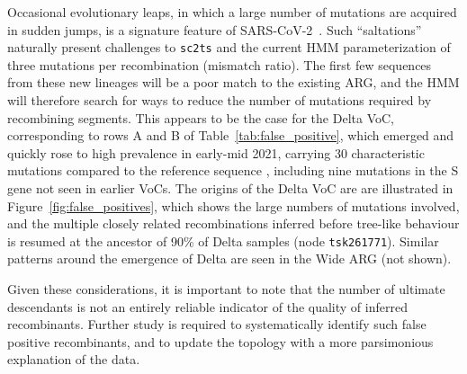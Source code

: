 \documentclass{article}
\begin{document}
Occasional evolutionary leaps, in which a large number of mutations
are acquired in sudden jumps,
is a signature feature of
SARS-CoV-2~\citep{Corey2021-sars,otto2021origins,Nielsen2023-host}.
Such ``saltations'' naturally present challenges to \texttt{sc2ts} and the
current HMM parameterization of three mutations per recombination (mismatch
ratio). The first few sequences from these new lineages will be a poor match to
the existing ARG, and the HMM will therefore
search for ways to reduce the number of mutations required by recombining
segments.
This appears to be the case for the Delta VoC,
corresponding to rows A and B of Table~\ref{tab:false_positive},
which emerged and quickly rose to high prevalence in early-mid 2021,
carrying 30 characteristic mutations compared to the reference sequence
\citep{McCrone2022-context}, including nine mutations in the S gene
not seen in earlier VoCs.
The origins of the  Delta VoC are
are illustrated in  Figure~\ref{fig:false_positives},
which shows the large numbers of mutations involved,
and the multiple closely related recombinations inferred
before tree-like behaviour is resumed at the ancestor of
90\% of Delta samples (node \texttt{tsk261771}).
Similar patterns around the emergence of Delta are seen in the Wide ARG
(not shown).

Given these considerations, it  is important to note that the
number of ultimate descendants is not an entirely reliable
indicator of the quality of inferred recombinants.
Further study is required to systematically identify such false
positive recombinants, and to update the topology with a
more parsimonious explanation of the data.
\end{document}
